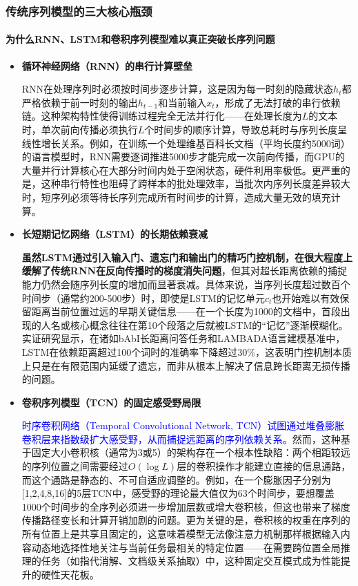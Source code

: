 \documentclass[11pt]{beamer}
\begin{document}
\begin{frame}
\frametitle{传统序列模型的三大核心瓶颈}
\framesubtitle{为什么RNN、LSTM和卷积序列模型难以真正突破长序列问题}

\begin{itemize}
    \item \textbf{循环神经网络（RNN）的串行计算壁垒}
    
    \alert{RNN在处理序列时必须按时间步逐步计算}，这是因为每一时刻的隐藏状态$h_t$都严格依赖于前一时刻的输出$h_{t-1}$和当前输入$x_t$，形成了无法打破的串行依赖链。这种架构特性使得训练过程完全无法并行化——在处理长度为$L$的文本时，单次前向传播必须执行$L$个时间步的顺序计算，导致总耗时与序列长度呈线性增长关系。例如，在训练一个处理维基百科长文档（平均长度约5000词）的语言模型时，RNN需要逐词推进5000步才能完成一次前向传播，而GPU的大量并行计算核心在大部分时间内处于空闲状态，硬件利用率极低。更严重的是，这种串行特性也阻碍了跨样本的批处理效率，当批次内序列长度差异较大时，短序列必须等待长序列完成所有时间步的计算，造成大量无效的填充计算。

    \item \textbf{长短期记忆网络（LSTM）的长期依赖衰减}
    
    \textbf{虽然LSTM通过引入输入门、遗忘门和输出门的精巧门控机制，在很大程度上缓解了传统RNN在反向传播时的梯度消失问题}，但其对超长距离依赖的捕捉能力仍然会随序列长度的增加而显著衰减。具体来说，当序列长度超过数百个时间步（通常约200-500步）时，即使是LSTM的记忆单元$c_t$也开始难以有效保留距离当前位置过远的早期关键信息——在一个长度为1000的文档中，首段出现的人名或核心概念往往在第10个段落之后就被LSTM的“记忆”逐渐模糊化。实证研究显示，在诸如bAbI长距离问答任务和LAMBADA语言建模基准中，LSTM在依赖距离超过100个词时的准确率下降超过30\%，这表明门控机制本质上只是在有限范围内延缓了遗忘，而非从根本上解决了信息跨长距离无损传播的问题。

    \item \textbf{卷积序列模型（TCN）的固定感受野局限}
    
    \textcolor{blue}{时序卷积网络（Temporal Convolutional Network, TCN）试图通过堆叠膨胀卷积层来指数级扩大感受野，从而捕捉远距离的序列依赖关系。}然而，这种基于固定大小卷积核（通常为3或5）的架构存在一个根本性缺陷：两个相距较远的序列位置之间需要经过$O(\log L)$层的卷积操作才能建立直接的信息通路，而这个通路是静态的、不可自适应调整的。例如，在一个膨胀因子分别为[1,2,4,8,16]的5层TCN中，感受野的理论最大值仅为63个时间步，要想覆盖1000个时间步的全序列必须进一步增加层数或增大卷积核，但这也带来了梯度传播路径变长和计算开销加剧的问题。更为关键的是，卷积核的权重在序列的所有位置上是共享且固定的，这意味着模型无法像注意力机制那样根据输入内容动态地选择性地关注与当前任务最相关的特定位置——在需要跨位置全局推理的任务（如指代消解、文档级关系抽取）中，这种固定交互模式成为性能提升的硬性天花板。
\end{itemize}
\end{frame}
\end{document}
